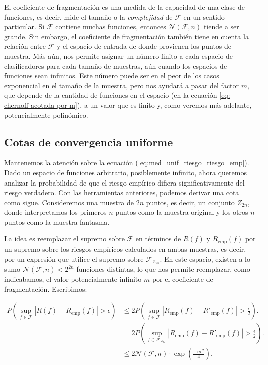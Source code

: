 \documentclass{report}
\begin{document}
El coeficiente de fragmentación es una medida de la capacidad de una clase de funciones, es decir, mide 
el tamaño o la \textit{complejidad} de \(\mathcal{F}\) en un sentido particular. Si \(\mathcal{F}\) contiene muchas funciones, entonces 
$\mathcal{N}(\mathcal{F}, n)$ tiende a ser grande. Sin embargo, el coeficiente de fragmentación también tiene en cuenta 
la relación entre \(\mathcal{F}\) y el espacio de entrada de donde provienen los puntos de muestra. Más aún, nos permite asignar un número
finito a cada espacio de clasificadores para cada tamaño de muestras, aún cuando los espacios de funciones sean infinitos. Este número puede
ser en el peor de los casos exponencial en el tamaño de la muestra, pero nos ayudará a pasar del factor $m$, que depende de la cantidad
de funciones en el espacio (en la ecuación \ref{eq: chernoff acotada por m}), a un valor que es finito y, como veremos más adelante,
potencialmente polinómico.\newline

\subsection{Cotas de convergencia uniforme}

Mantenemos la atención sobre la ecuación (\ref{eq:med_unif_riesgo_riesgo_emp}). Dado un espacio de funciones arbitrario, 
posiblemente infinito, ahora queremos analizar la probabilidad 
de que el riesgo empírico difiera significativamente del riesgo verdadero. Con las herramientas anteriores, 
podemos derivar una cota como sigue. Consideremos una muestra de \(2n\) puntos, es decir, un conjunto 
\(Z_{2n}\), donde interpretamos los primeros \(n\) puntos como la muestra original y los otros \(n\) 
puntos como la muestra fantasma.\newline

La idea es reemplazar el supremo sobre \(\mathcal{F}\) en términos de \(R(f)\) y 
\(R_{\text{emp}}(f)\) por un supremo sobre los riesgos empíricos calculados en ambas muestras, es decir, por un expresión
que utilice el supremo sobre \(\mathcal{F}_{Z_{2n}}\). En este espacio, existen a lo sumo $\mathcal{N}(\mathcal{F}, n)<2^{2n}$
funciones distintas, lo que nos permite reemplazar, como indicabamos, el valor potencialmente infinito $m$ por el coeficiente de 
fragmentación. Escribimos:\newline

\[
\begin{aligned}
P\left(\sup_{f \in \mathcal{F}} |R(f) - R_{\text{emp}}(f)| > \epsilon\right) &\leq 
2P\left(\sup_{f \in \mathcal{F}} |R_{\text{emp}}(f) - R'_{\text{emp}}(f)| > \frac{\epsilon}{2}\right).\\
& = 2P\left(\sup_{f \in \mathcal{F}_{Z_{2n}}} |R_{\text{emp}}(f) - R'_{\text{emp}}(f)| > \frac{\epsilon}{2}\right).\\
& \leq 2  \mathcal{N}(\mathcal{F}, n)\cdot \exp\left(\frac{-n\epsilon^2}{4}\right).
\end{aligned}
\]
\end{document}
